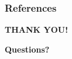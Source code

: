 \documentclass[10pt]{beamer}
\theoremstyle{definition}
\newcommand{\colubf}{\color{UniBlue}\bf}
\begin{document}

\begin{frame}
\frametitle{References}
{\scriptsize


}
\end{frame}


\begin{frame}
\centering
{\huge\textcolor{UniBlue}{\textbf{THANK YOU!}}}\\

\vspace{2em}

\vspace{1em}
{\colubf Questions?}
\end{frame}
\end{document}
